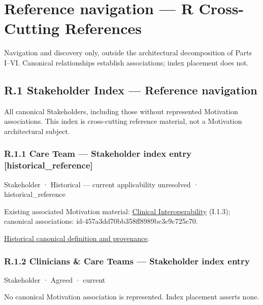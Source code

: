 \part*{Reference navigation — R Cross-Cutting References}
\label{navigation:R}
Navigation and discovery only, outside the architectural decomposition of Parts I–VI. Canonical relationships establish associations; index placement does not.\par
\chapter*{R.1 Stakeholder Index — Reference navigation}
\label{navigation:R.1}

All canonical Stakeholders, including those without represented Motivation associations. This index is cross-cutting reference material, not a Motivation architectural subject.\par
\section*{R.1.1 Care Team — Stakeholder index entry [historical\_reference]}
\label{navigation:R.1.1}

\label{element:6f5a203d81e24a81b384a80781987daa}
{\small Stakeholder · Historical — current applicability unresolved · historical\_reference}\par
{\small Existing associated Motivation material: \hyperref[element:babb9f5d63d8435890c1db3579ec78d9]{Clinical Interoperability} (I.1.3); canonical associations: id-457a3dd70bb358ff8989bc3c9c725c70.}\par
\href{../../../../continuum/motivation/stakeholder/6f5a203d81e24a81b384a80781987daa.md}{Historical canonical definition and provenance}.\par
\section*{R.1.2 Clinicians \& Care Teams — Stakeholder index entry}
\label{navigation:R.1.2}

\label{element:37264af5adb64b37b7537e3d48b6747b}
{\small Stakeholder · Agreed · current}\par
No canonical Motivation association is represented. Index placement asserts none.\par

